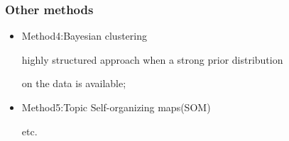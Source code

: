 \begin{frame}
    \frametitle{Other methods}
    \begin{itemize}
     \item Method4:Bayesian clustering

    \hspace{0.9em} highly structured approach when a strong prior distribution 
    
    \hspace{0.9em} on the data is available; 

    \item Method5:Topic Self-organizing maps(SOM) 

    etc.
\end{itemize}
\end{frame}
